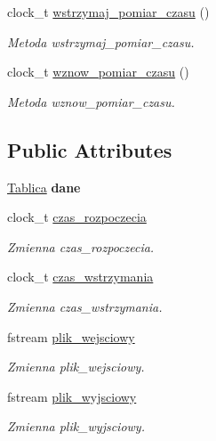\begin{DoxyCompactItemize}
clock\+\_\+t \hyperlink{class_program_aac837dd96e761e55fd3faa2b197635fc}{wstrzymaj\+\_\+pomiar\+\_\+czasu} ()
\begin{DoxyCompactList}\small\item\em Metoda wstrzymaj\+\_\+pomiar\+\_\+czasu. \end{DoxyCompactList}\item 
clock\+\_\+t \hyperlink{class_program_a7c069b25265a74e466ac9b868fcf0a9d}{wznow\+\_\+pomiar\+\_\+czasu} ()
\begin{DoxyCompactList}\small\item\em Metoda wznow\+\_\+pomiar\+\_\+czasu. \end{DoxyCompactList}\end{DoxyCompactItemize}
\subsection*{Public Attributes}
\begin{DoxyCompactItemize}
\item 
\hypertarget{class_program_ac27fc896de0e4c87cc6a17290c0930ef}{\hyperlink{class_tablica}{Tablica} {\bfseries dane}}\label{class_program_ac27fc896de0e4c87cc6a17290c0930ef}

\item 
clock\+\_\+t \hyperlink{class_program_a8cdcc795adc329732f41b399044d0a5b}{czas\+\_\+rozpoczecia}
\begin{DoxyCompactList}\small\item\em Zmienna czas\+\_\+rozpoczecia. \end{DoxyCompactList}\item 
clock\+\_\+t \hyperlink{class_program_aded0e8c471b06c63a58d47994ddac83f}{czas\+\_\+wstrzymania}
\begin{DoxyCompactList}\small\item\em Zmienna czas\+\_\+wstrzymania. \end{DoxyCompactList}\item 
fstream \hyperlink{class_program_a532ceacb1d70da66142bab96a3eb0753}{plik\+\_\+wejsciowy}
\begin{DoxyCompactList}\small\item\em Zmienna plik\+\_\+wejsciowy. \end{DoxyCompactList}\item 
fstream \hyperlink{class_program_aaa305591a4333d799c8d353f3072d8e0}{plik\+\_\+wyjsciowy}
\begin{DoxyCompactList}\small\item\em Zmienna plik\+\_\+wyjsciowy. \end{DoxyCompactList}\end{DoxyCompactItemize}


